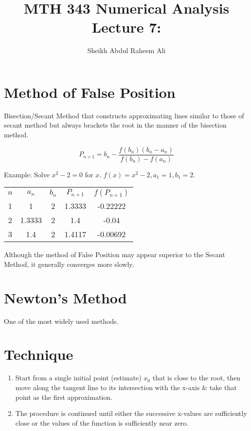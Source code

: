 \documentclass[]{article}
\title{MTH 343 Numerical Analysis Lecture 7:}
\author{Sheikh Abdul Raheem Ali}
\begin{document}
\maketitle

\section{Method of False Position}

Bisection/Secant Method that constructs approximating lines similar to those of secant method but always brackets the root in the manner of the bisection method. 

\[ P_{n+1} = b_n - \frac{f(b_n)(b_n - a_n)}{f(b_n) - f(a_n)} \]

Example: Solve $ x^2 - 2 = 0 $ for $ x $. $ f(x) = x^2 - 2, a_1 = 1, b_1 = 2. $

\begin{tabular}{c c c c c}
	$ n $ & $ a_n $ & $ b_n $ & $ P_{n+1} $ & $ f(P_{n+1}) $ \\
	1&1&2&1.3333&-0.22222\\
	2&1.3333&2&1.4&-0.04\\
	3&1.4&2&1.4117&-0.00692\\
\end{tabular}

Although the method of False Position may appear superior to the Secant Method, it generally converges more slowly. 

\section{Newton's Method}

One of the most widely used methods.

\section*{Technique}

\begin{enumerate}
	\item Start from a single initial point (estimate) $ x_0 $ that is close to the root, then move along the tangent line to its intersection with the x-axis \& take that point as the first approximation.
	\item The procedure is continued until either the successive x-values are sufficiently close or the values of the function is sufficiently near zero.
\end{enumerate}
\end{document}
